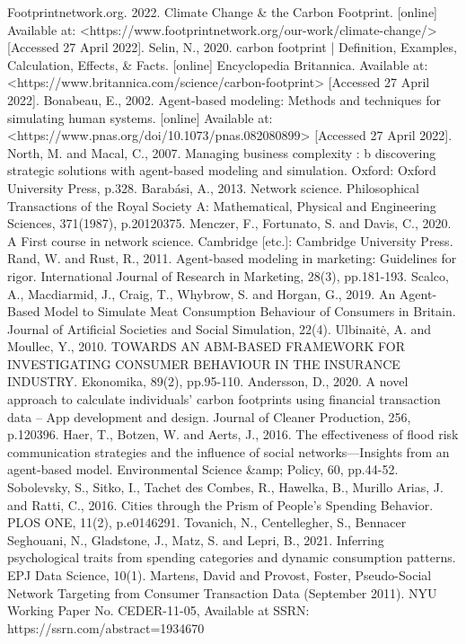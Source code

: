 \documentclass[a4paper,11pt]{article}
\begin{document}
\begin{thebibliography}{9}
Footprintnetwork.org. 2022. Climate Change \& the Carbon Footprint. [online] Available at: <https://www.footprintnetwork.org/our-work/climate-change/> [Accessed 27 April 2022].
Selin, N., 2020. carbon footprint | Definition, Examples, Calculation, Effects, \& Facts. [online] Encyclopedia Britannica. Available at: <https://www.britannica.com/science/carbon-footprint> [Accessed 27 April 2022].
Bonabeau, E., 2002. Agent-based modeling: Methods and techniques for simulating human systems. [online] Available at: <https://www.pnas.org/doi/10.1073/pnas.082080899> [Accessed 27 April 2022].
North, M. and Macal, C., 2007. Managing business complexity : b discovering strategic solutions with agent-based modeling and simulation. Oxford: Oxford University Press, p.328.
Barabási, A., 2013. Network science. Philosophical Transactions of the Royal Society A: Mathematical, Physical and Engineering Sciences, 371(1987), p.20120375.
Menczer, F., Fortunato, S. and Davis, C., 2020. A First course in network science. Cambridge [etc.]: Cambridge University Press.
Rand, W. and Rust, R., 2011. Agent-based modeling in marketing: Guidelines for rigor. International Journal of Research in Marketing, 28(3), pp.181-193.
Scalco, A., Macdiarmid, J., Craig, T., Whybrow, S. and Horgan, G., 2019. An Agent-Based Model to Simulate Meat Consumption Behaviour of Consumers in Britain. Journal of Artificial Societies and Social Simulation, 22(4).
Ulbinaitė, A. and Moullec, Y., 2010. TOWARDS AN ABM-BASED FRAMEWORK FOR INVESTIGATING CONSUMER BEHAVIOUR IN THE INSURANCE INDUSTRY. Ekonomika, 89(2), pp.95-110.
Andersson, D., 2020. A novel approach to calculate individuals’ carbon footprints using financial transaction data – App development and design. Journal of Cleaner Production, 256, p.120396.
Haer, T., Botzen, W. and Aerts, J., 2016. The effectiveness of flood risk communication strategies and the influence of social networks—Insights from an agent-based model. Environmental Science \&amp; Policy, 60, pp.44-52.
Sobolevsky, S., Sitko, I., Tachet des Combes, R., Hawelka, B., Murillo Arias, J. and Ratti, C., 2016. Cities through the Prism of People’s Spending Behavior. PLOS ONE, 11(2), p.e0146291.
Tovanich, N., Centellegher, S., Bennacer Seghouani, N., Gladstone, J., Matz, S. and Lepri, B., 2021. Inferring psychological traits from spending categories and dynamic consumption patterns. EPJ Data Science, 10(1).
Martens, David and Provost, Foster, Pseudo-Social Network Targeting from Consumer Transaction Data (September 2011). NYU Working Paper No. CEDER-11-05, Available at SSRN: https://ssrn.com/abstract=1934670

\end{thebibliography}
\end{document}
